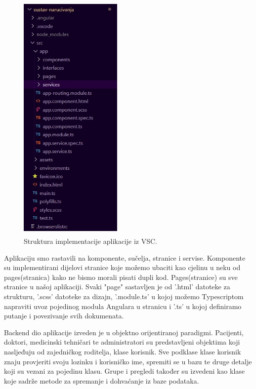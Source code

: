             \begin{figure}[H]
			            \includegraphics[width=50mm, height= 125mm]{slike/arh.jpg} %
			            \caption{Struktura implementacije aplikacije iz VSC.}
			            \label{fig:promjene2} %
		            \end{figure}

              
               \texttt{}{ Aplikaciju smo rastavili na komponente, sučelja, stranice i servise. 
               Komponente su implementirani dijelovi stranice koje možemo ubaciti kao cjelinu u neku od pages(stranica) kako ne bismo morali pisati dupli kod. Pages(stranice) su sve stranice u našoj aplikaciji. Svaki "page" sastavljen je od '.html' datoteke za strukturu, '.scss' datoteke za dizajn, '.module.ts' u kojoj možemo Typescriptom napraviti uvoz pojedinog modula Angulara u stranicu i '.ts' u kojoj definiramo putanje i povezivanje svih dokumenata.
               
               }

                \texttt{}{ Backend dio aplikacije izveden je u objektno orijentiranoj paradigmi. Pacijenti, doktori, medicinski tehničari te administratori su predstavljeni objektima koji nasljeđuju od zajedničkog roditelja, klase korisnik. Sve podklase klase korisnik znaju provjeriti svoju lozinku i korisničko ime, spremiti se u bazu te druge detalje koji su vezani za pojedinu klasu. Grupe i pregledi također su izvedeni kao klase koje sadrže metode za spremanje i dohvaćanje iz baze podataka.
               }
        
